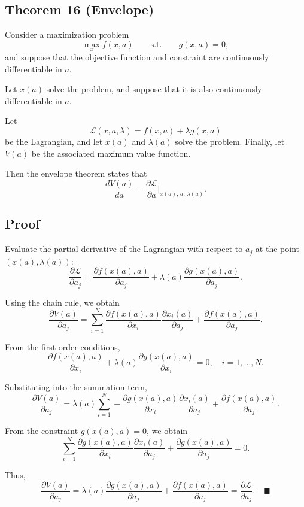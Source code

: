 \begin{tcolorbox}[breakable, colback=white]
\subsection*{Theorem 16 (Envelope)}

Consider a maximization problem
\[
\max_x f(x,a)
\qquad \text{s.t.} \qquad g(x,a)=0,
\]
and suppose that the objective function and constraint are continuously
differentiable in $a$.

Let $x(a)$ solve the problem, and suppose that it is also continuously
differentiable in $a$.

Let
\[
\mathcal{L}(x,a,\lambda)=f(x,a)+\lambda g(x,a)
\]
be the Lagrangian, and let $x(a)$ and $\lambda(a)$ solve the problem.
Finally, let $V(a)$ be the associated maximum value function.

Then the envelope theorem states that
\[
\frac{dV(a)}{da}
=
\frac{\partial \mathcal{L}}{\partial a}\Big|_{x(a),\,a,\,\lambda(a)}.
\]


\subsection*{Proof}

Evaluate the partial derivative of the Lagrangian with respect to $a_j$
at the point $(x(a),\lambda(a))$:
\[
\frac{\partial \mathcal{L}}{\partial a_j}
=
\frac{\partial f(x(a),a)}{\partial a_j}
+
\lambda(a)\frac{\partial g(x(a),a)}{\partial a_j}.
\]

Using the chain rule, we obtain
\[
\frac{\partial V(a)}{\partial a_j}
=
\sum_{i=1}^N
\frac{\partial f(x(a),a)}{\partial x_i}
\frac{\partial x_i(a)}{\partial a_j}
+
\frac{\partial f(x(a),a)}{\partial a_j}.
\]

From the first-order conditions,
\[
\frac{\partial f(x(a),a)}{\partial x_i}
+
\lambda(a)\frac{\partial g(x(a),a)}{\partial x_i}
=0,
\quad i=1,\dots,N.
\]

Substituting into the summation term,
\[
\frac{\partial V(a)}{\partial a_j}
=
\lambda(a)
\sum_{i=1}^N
-\frac{\partial g(x(a),a)}{\partial x_i}
\frac{\partial x_i(a)}{\partial a_j}
+
\frac{\partial f(x(a),a)}{\partial a_j}.
\]

From the constraint $g(x(a),a)=0$, we obtain
\[
\sum_{i=1}^N
\frac{\partial g(x(a),a)}{\partial x_i}
\frac{\partial x_i(a)}{\partial a_j}
+
\frac{\partial g(x(a),a)}{\partial a_j}
=0.
\]

Thus,
\[
\frac{\partial V(a)}{\partial a_j}
=
\lambda(a)\frac{\partial g(x(a),a)}{\partial a_j}
+
\frac{\partial f(x(a),a)}{\partial a_j}
=
\frac{\partial \mathcal{L}}{\partial a_j}.
\quad \blacksquare
\]
\end{tcolorbox}




